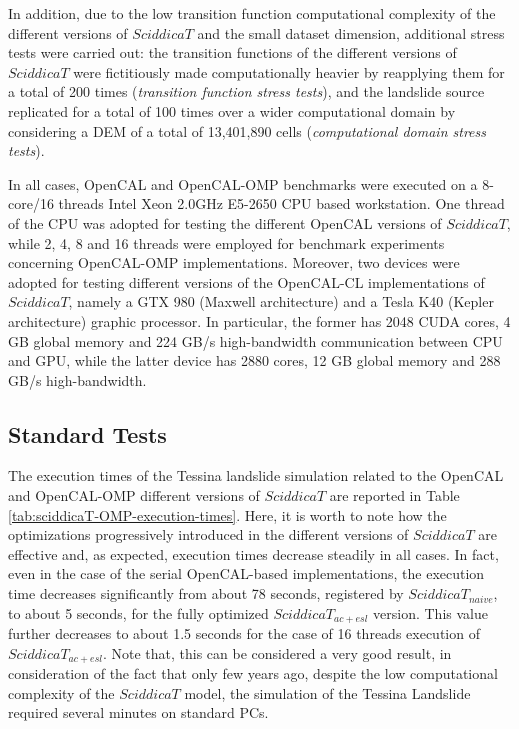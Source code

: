 In addition, due to the low transition function computational
complexity of the different versions of $SciddicaT$ and the small
dataset dimension, additional stress tests were carried out: the
transition functions of the different versions of $SciddicaT$ were
fictitiously made computationally heavier by reapplying them for a
total of 200 times (\emph{transition function stress tests}), and
the landslide source replicated for a total of 100 times over a
wider computational domain by considering a DEM of a total of
13,401,890 cells (\emph{computational domain stress tests}).

In all cases, OpenCAL and OpenCAL-OMP benchmarks were executed on a
8-core/16 threads Intel Xeon 2.0GHz E5-2650 CPU based
workstation. One thread of the CPU was adopted for testing the
different OpenCAL versions of $SciddicaT$, while 2, 4, 8 and 16
threads were employed for benchmark experiments concerning
OpenCAL-OMP implementations. Moreover, two devices were adopted for
testing different versions of the OpenCAL-CL implementations of
$SciddicaT$, namely a GTX 980 (Maxwell architecture) and a Tesla K40
(Kepler architecture) graphic processor. In particular, the former
has 2048 CUDA cores, 4 GB global memory and 224 GB/s high-bandwidth
communication between CPU and GPU, while the latter device has 2880
cores, 12 GB global memory and 288 GB/s high-bandwidth.

\subsection{Standard Tests}
\label{sec:standard_tests}
The execution times of the Tessina landslide simulation related to
the OpenCAL and OpenCAL-OMP different versions of $SciddicaT$ are
reported in Table \ref{tab:sciddicaT-OMP-execution-times}. Here,
it is worth to note how the optimizations progressively introduced
in the different versions of $SciddicaT$ are effective and, as
expected, execution times decrease steadily in all cases. In fact,
even in the case of the serial OpenCAL-based implementations, the
execution time decreases significantly from about 78 seconds,
registered by $SciddicaT_{naive}$, to about 5 seconds, for the
fully optimized $SciddicaT_{ac+esl}$ version. This value further
decreases to about 1.5 seconds for the case of 16 threads
execution of $SciddicaT_{ac+esl}$. Note that, this can be
considered a very good result, in consideration of the fact that
only few years ago, despite the low computational complexity of
the $SciddicaT$ model, the simulation of the Tessina Landslide
required several minutes on standard PCs.

